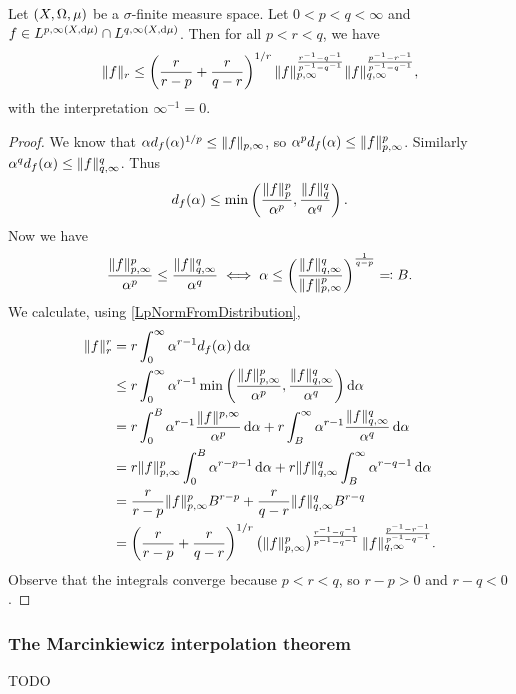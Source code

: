 \begin{proposition}
Let $\left( X,\Omega, \mu \right)$ be a $\sigma$-finite measure space.
Let $0<p<q<\infty$ and $f\in L^{p,\infty(X,\operatorname{d \!}{\mu})} \cap L^{q,\infty(X,\operatorname{d \!}{\mu})}$. Then for all $p<r<q$, we have
\[ \lVert f\rVert_r \leq \left(\frac{r}{r-p} + \frac{r}{q-r}\right)^{1/r}\lVert f\rVert_{p,\infty}^{\frac{r^{-1}- q^{-1}}{p^{-1} - q^{-1}}}\lVert f\rVert_{q,\infty}^{\frac{p^{-1}- r^{-1}}{p^{-1} - q^{-1}}}, \]
with the interpretation $\infty^{-1} = 0$.
\end{proposition}
\begin{proof}
We know that $\alpha d_f(\alpha)^{1/p} \leq \lVert f\rVert_{p,\infty}$, so $\alpha^p d_f(\alpha) \leq \lVert f\rVert_{p,\infty}^p$. Similarly $\alpha^q d_f(\alpha) \leq \lVert f\rVert_{q,\infty}^q$. Thus
\[ d_f(\alpha) \leq \min\left(\frac{\lVert f\rVert^p_p}{\alpha^p}, \frac{\lVert f\rVert^q_q}{\alpha^q}\right). \]
Now we have
\[ \frac{\lVert f\rVert^p_{p,\infty}}{\alpha^p} \leq \frac{\lVert f\rVert^q_{q,\infty}}{\alpha^q} \iff \alpha \leq \left(\frac{\lVert f\rVert_{q,\infty}^q}{\lVert f\rVert_{p,\infty}^p}\right)^{\frac{1}{q-p}} \eqqcolon B. \]
We calculate, using \ref{LpNormFromDistribution},
\begin{align*}
\lVert f\rVert_r^r &= r \int_0^\infty\alpha^{r-1}d_f(\alpha)\operatorname{d \!}{\alpha} \\
&\leq r \int_0^\infty\alpha^{r-1}\min\left(\frac{\lVert f\rVert^p_{p,\infty}}{\alpha^p}, \frac{\lVert f\rVert^q_{q,\infty}}{\alpha^q}\right)\operatorname{d \!}{\alpha} \\
&= r \int_0^B\alpha^{r-1}\frac{\lVert f\rVert^{p,\infty}}{\alpha^p}\operatorname{d \!}{\alpha} + r \int_B^\infty\alpha^{r-1}\frac{\lVert f\rVert^q_{q,\infty}}{\alpha^q}\operatorname{d \!}{\alpha} \\
&= r \lVert f\rVert^p_{p,\infty} \int_0^B\alpha^{r-p-1}\operatorname{d \!}{\alpha} + r \lVert f\rVert^q_{q,\infty} \int_B^\infty\alpha^{r-q-1}\operatorname{d \!}{\alpha} \\
&= \frac{r}{r-p} \lVert f\rVert^p_{p,\infty} B^{r-p} + \frac{r}{q-r} \lVert f\rVert^q_{q,\infty} B^{r-q} \\
&= \left(\frac{r}{r-p} + \frac{r}{q-r}\right)^{1/r}\left(\lVert f\rVert_{p,\infty}^p\right)^{\frac{r^{-1}- q^{-1}}{p^{-1} - q^{-1}}}\lVert f\rVert_{q,\infty}^{\frac{p^{-1}- r^{-1}}{p^{-1} - q^{-1}}}.
\end{align*}
Observe that the integrals converge because $p<r<q$, so $r-p>0$ and $r-q<0$.
\end{proof}

\subsubsection{The Marcinkiewicz interpolation theorem}
TODO
